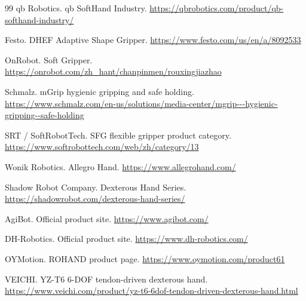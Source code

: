 \documentclass[11pt]{article}
\begin{document}
\begin{thebibliography}{99}
qb Robotics.
qb SoftHand Industry.
\url{https://qbrobotics.com/product/qb-softhand-industry/}

Festo.
DHEF Adaptive Shape Gripper.
\url{https://www.festo.com/us/en/a/8092533}

OnRobot.
Soft Gripper.
\url{https://onrobot.com/zh_hant/chanpinmen/rouxingjiazhao}

Schmalz.
mGrip hygienic gripping and safe holding.
\url{https://www.schmalz.com/en-us/solutions/media-center/mgrip---hygienic-gripping--safe-holding}

SRT / SoftRobotTech.
SFG flexible gripper product category.
\url{https://www.softrobottech.com/web/zh/category/13}

Wonik Robotics.
Allegro Hand.
\url{https://www.allegrohand.com/}

Shadow Robot Company.
Dexterous Hand Series.
\url{https://shadowrobot.com/dexterous-hand-series/}

AgiBot.
Official product site.
\url{https://www.agibot.com/}

DH-Robotics.
Official product site.
\url{https://www.dh-robotics.com/}

OYMotion.
ROHAND product page.
\url{https://www.oymotion.com/product61}

VEICHI.
YZ-T6 6-DOF tendon-driven dexterous hand.
\url{https://www.veichi.com/product/yz-t6-6dof-tendon-driven-dexterous-hand.html}

\end{thebibliography}
\end{document}
